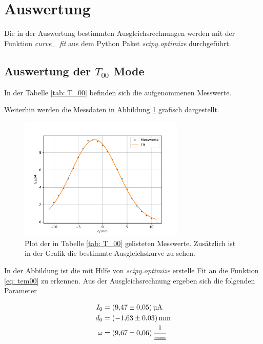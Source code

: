 \section{Auswertung}

Die in der Auswertung bestimmten Ausgleichsrechnungen werden mit
der Funktion \emph{curve\_ fit} aus dem Python Paket \emph{scipy.optimize}\cite{scipy} durchgeführt. %

\subsection{Auswertung der $T_{00}$ Mode}
\FloatBarrier
In der Tabelle \ref{tab: T_00} befinden sich die aufgenommenen Messwerte.

Weiterhin werden die Messdaten in Abbildung \ref{fig: T_00} grafisch dargestellt.
\begin{figure}[h!]
  \centering
  \includegraphics[width=0.7\textwidth]{../Messdaten/plots/T_00.pdf}
  \caption{Plot der in Tabelle \ref{tab: T_00} gelisteten Messwerte. Zusätzlich ist in der Grafik die bestimmte Ausgleichskurve zu sehen.}
  \label{fig: T_00}
\end{figure}
In der Abbildung ist die mit Hilfe von \emph{scipy.optimize} erstelle Fit an die Funktion \eqref{eq: tem00} zu erkennen. %
Aus der Ausgleichsrechnung ergeben sich die folgenden Parameter

\begin{align}
  \label{eq: fit_t_00}
  \begin{aligned}
  I_0&=\SI{9.47 \pm 0.05}{\micro\ampere}\\
  d_0&=\SI{-1.63\pm 0.03}{\milli\meter}\\
  \omega&=\SI{9.67\pm0.06}{\per\milli\meter}
\end{aligned}
\end{align}
\FloatBarrier
